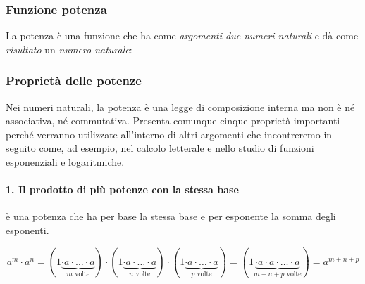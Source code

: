
\subsubsection{Funzione potenza}

La potenza è una funzione che ha come \emph{argomenti due numeri naturali} 
e dà come \emph{risultato} un \emph{numero naturale}:

\vspace{.5em}


\subsubsection{Proprietà delle potenze}

Nei numeri naturali, la potenza è una legge di composizione interna 
 ma non è né associativa, né 
commutativa.
Presenta comunque cinque proprietà importanti perché verranno utilizzate 
all'interno di altri argomenti che incontreremo in seguito come, ad 
esempio, nel calcolo letterale e nello studio di funzioni esponenziali e 
logaritmiche.

\paragraph{1. Il prodotto di più potenze con la stessa base} 
è una potenza che ha per base la stessa base e per esponente la somma 
degli esponenti.

\[a^m \cdot a^n = 
  (1 \underbrace{\cdot a \cdot \ldots \cdot a}_{m \text{ volte}}) 
\cdot 
  (1 \underbrace{\cdot a \cdot \ldots \cdot a}_{n \text{ volte}}) 
\cdot 
  (1 \underbrace{\cdot a \cdot \ldots \cdot a}_{p \text{ volte}}) =
  (1 \underbrace{\cdot a \cdot a \cdot \ldots 
  \cdot a}_{m+n+p\text{ volte}}) = a^{m+n+p}\]

